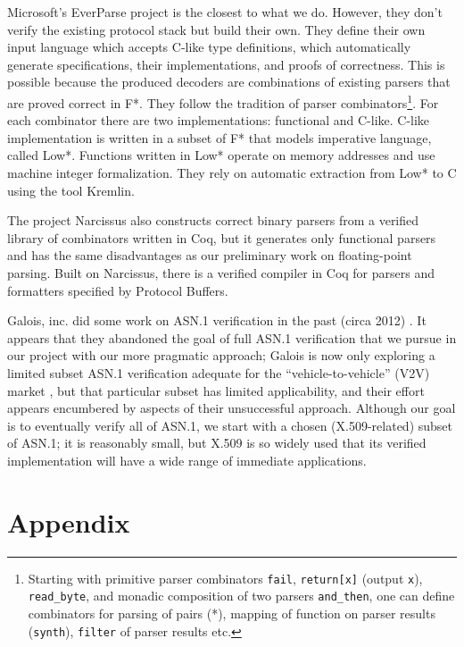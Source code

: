 \documentclass[10p,conference]{IEEEtran}
\begin{document}
Microsoft's EverParse project \cite{RamananandroDFS19} is the closest
to what we do. However, they don't verify the existing protocol stack but
build their own. They define their own input language which accepts
C-like type definitions, which automatically generate specifications, their implementations, and proofs of correctness. This is possible because the produced decoders are combinations of existing parsers that are proved correct in F*. They
follow the tradition of parser combinators\footnote{Starting with
  primitive parser combinators \texttt{fail}, \texttt{return[x]}
  (output \texttt{x}), \texttt{read\_byte}, and monadic composition of
  two parsers \texttt{and\_then}, one can define combinators for
  parsing of pairs (*), mapping of function on parser results
  (\texttt{synth}), \texttt{filter} of parser results etc.}. For each
combinator there are two implementations: functional and
C-like. C-like implementation is written in a subset of F* that models
imperative language, called Low*. Functions written in Low* operate on
memory addresses and use machine integer formalization. They rely on
automatic extraction from Low* to C using the tool Kremlin.

The project Narcissus \cite{Narcissus} also constructs correct binary parsers from a verified
library of combinators written in Coq, but it generates only functional
parsers and has the same disadvantages as our preliminary work on floating-point parsing. Built on Narcissus, there is a verified compiler in Coq for
parsers and formatters specified by Protocol Buffers.
 
Galois, inc. did some work on ASN.1 verification in
the past (circa 2012) \cite{ASN1FormalSem}. It appears that they abandoned
 the goal of full ASN.1 verification \cite{ASN1EncDec} that we pursue in
our project with our more pragmatic approach; Galois is now only
exploring a limited subset ASN.1 verification adequate for the
``vehicle-to-vehicle'' (V2V) market \cite{V2V}, but that
particular subset has limited applicability, and their
effort appears encumbered by aspects of their unsuccessful approach. Although our goal is to eventually verify all of ASN.1, we
start with a chosen (X.509-related) subset of ASN.1; it is reasonably small, but X.509 is so widely used that its verified implementation will have a wide range of immediate applications.

 \onecolumn
\section*{Appendix}
\end{document}
